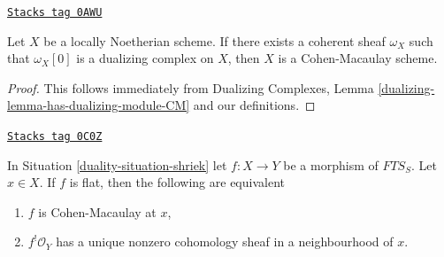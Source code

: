 \begin{lemma}
\label{duality-lemma-has-dualizing-module-CM-scheme}
\href{https://stacks.math.columbia.edu/tag/0AWU}{\texttt{Stacks tag 0AWU}}

Let $X$ be a locally Noetherian scheme. If there exists a coherent sheaf
$\omega_X$ such that $\omega_X[0]$ is a dualizing complex on $X$, then
$X$ is a Cohen-Macaulay scheme.
\end{lemma}

\begin{proof}
This follows immediately from
Dualizing Complexes, Lemma \ref{dualizing-lemma-has-dualizing-module-CM}
and our definitions.
\end{proof}

\begin{lemma}
\label{duality-lemma-affine-flat-Noetherian-CM}
\href{https://stacks.math.columbia.edu/tag/0C0Z}{\texttt{Stacks tag 0C0Z}}

In Situation \ref{duality-situation-shriek} let $f : X \to Y$ be a morphism
of $\textit{FTS}_S$. Let $x \in X$. If $f$ is flat, then
the following are equivalent
\begin{enumerate}
\item $f$ is Cohen-Macaulay at $x$,
\item $f^!\mathcal{O}_Y$ has a unique nonzero cohomology sheaf
in a neighbourhood of $x$.
\end{enumerate}
\end{lemma}

